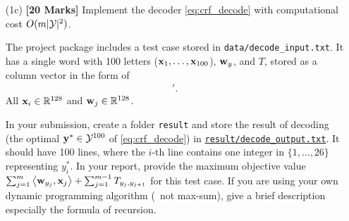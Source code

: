 \documentclass[11pt]{report}
\begin{document}
\begin{itemize}
	Hint: $T_{y_j, y_{j+1}} = \sum_{p \in \Ycal, q \in \Ycal} T_{pq} \cdot \llbracket (y_j, y_{j+1}) = (p,q)  \rrbracket$.

	{\bf [Answer:]} 

	As we have shown in \eqref{eq:gradient_wy}, $\grad_{\wvec_y} logZ_{X^t} = \sum_{\yvec \in \Ycal^m}p(\yvec|X^t) \sum_{s=1}^m \sembrack{y_s = y} \xvec^t_s$. 
	\begin{align}
		\sum_{\yvec \in \Ycal^m}p(\yvec|X^t) \sum_{s=1}^m \sembrack{y_s = y} \xvec^t_s = \EE_{\yvec \sim p(\yvec|X^t; \thetavec)} \sum_{s=1}^m \sembrack{y_s = y} \xvec^t_s
	\end{align} 

	where $\thetavec = [\wvec'_1, \ldots, \wvec'_{26}, T_{1,1}, T_{2,1}, \ldots, T_{26, 1}, T_{1,2}, \ldots, T_{26, 2}, \ldots, T_{1, 26}, \ldots, T_{26, 26}]'$.

	The feature in this case would be $\phi(X,\yvec) = \sum_{s=1}^m \sembrack{y_s = y} \xvec^t_s; \forall y \in \Ycal = \{1, 2, ..., 26\}$. 

	In (1a) \eqref{eq:gradient_T}, we also showed that $\grad_{T_{ij}} logZ_{X^t} = \sum_{\yvec \in \Ycal^m}p(\yvec|X^t) \sum_{s=1}^{m-1} \sembrack{y_s = i, y_{s+1} = j} $.
	\begin{align}
		\sum_{\yvec \in \Ycal^m}p(\yvec|X^t) \sum_{s=1}^{m-1} \sembrack{y_s = i, y_{s+1} = j} = \EE_{\yvec \sim p(\yvec|X^t; \thetavec)} \sum_{s=1}^{m-1} \sembrack{y_s = i, y_{s+1} = j} 
	\end{align}

	The feature is $\phi(X,\yvec) = \sum_{s=1}^{m-1} \sembrack{y_s = i, y_{s+1} = j}; \forall (i, j) \in \Ycal = \{1, 2, ..., 26\}$, which does not depend on $X$. 

	
	\item[(1c)] {\bf [20 Marks]} Implement the decoder \eqref{eq:crf_decode} with computational cost $O(m|\mathcal{Y}|^2)$.

	The project package includes a test case stored in \verb#data/decode_input.txt#.
	It has a single word with 100 letters ($\mathbf{\boldsymbol{x}}_1, \ldots, \mathbf{\boldsymbol{x}}_{100}$), $\mathbf{\boldsymbol{w}}_y$, and $T$, stored as a column vector in the form of
	\begin{align}
		[\xvec'_1, \ldots, \xvec'_{100}, \wvec'_1, \ldots, \wvec'_{26}, T_{1,1}, T_{2,1}, \ldots, T_{26, 1}, T_{1,2}, \ldots, T_{26, 2}, \ldots, T_{1, 26}, \ldots, T_{26, 26}]'.
	\end{align}
	All $\mathbf{\boldsymbol{x}}_i \in \mathbb{R}^{128}$ and $\mathbf{\boldsymbol{w}}_j \in \mathbb{R}^{128}$.
	
	In your submission, create a folder \verb#result# and store the result of decoding (the optimal $\mathbf{\boldsymbol{y}}^* \in \mathcal{Y}^{100}$ of \eqref{eq:crf_decode}) in \underline{\texttt{result/decode\_output.txt}}.
	It should have 100 lines,
	where the $i$-th line contains one integer in $\{1,\ldots,26\}$ representing $y^*_i$.
	In your report, provide the maximum objective value $\sum_{j=1}^m \left\langle \mathbf{\boldsymbol{w}}_{y_j},\mathbf{\boldsymbol{x}}_j \right\rangle + \sum_{j=1}^{m-1} T_{y_j, y_{j+1}}$ for this test case.
	If you are using your own dynamic programming algorithm (\ie\ not max-sum),
	give a brief description especially the formula of recursion.


\end{itemize}
\end{document}
